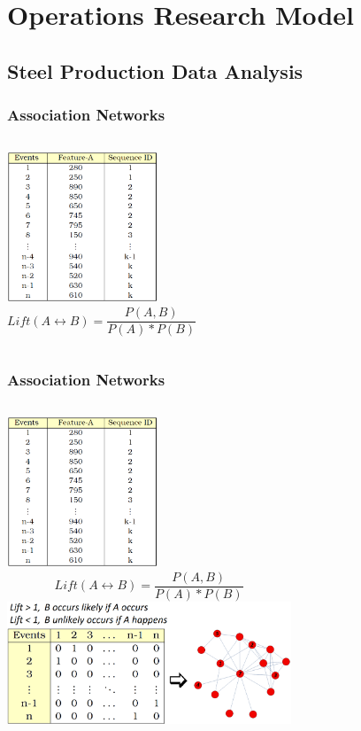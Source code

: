 \section[Operations Research Model]{Operations Research Model}
\subsection[Steel Production Data Analysis]{Steel Production Data Analysis}
\begin{frame}
	\frametitle{Association Networks}
	\begin{columns}[c]
		\centering
		\includegraphics[height=4.5cm]{../tables/arbitrary_production_data_set.png}
		\[Lift(A\leftrightarrow B)=\frac{P(A,B)}{P(A)*P(B)}\]
	\end{columns}
\end{frame}
\begin{frame}
	\frametitle{Association Networks}
	\begin{columns}[c]
		\centering
		\includegraphics[height=4.5cm]{../tables/arbitrary_production_data_set.png}
		\[Lift(A\leftrightarrow B)=\frac{P(A,B)}{P(A)*P(B)}\]
		\includegraphics[width=8.5cm]{../tables/methodology-association-networks-adjacency_graph.png}
	\end{columns}
\end{frame}
